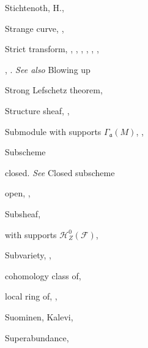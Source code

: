 {{\noindent\hspace*{0.0bp}Stichtenoth, H., \par
\noindent\hspace*{0.0bp}Strange curve, , \par
\noindent\hspace*{0.0bp}Strict transform, , , , , , ,\par
\noindent\hspace*{15.0bp}, . \emph{See also} Blowing up\par
\noindent\hspace*{0.0bp}Strong Lefschetz theorem, \par
\noindent\hspace*{0.0bp}Structure sheaf, , \par
\noindent\hspace*{0.0bp}Submodule with supports $\Gamma_{\mathfrak a}(M)$, , \par
\noindent\hspace*{0.0bp}Subscheme\par
\noindent\hspace*{7.5bp}closed. \emph{See} Closed subscheme\par
\noindent\hspace*{7.5bp}open, , \par
\noindent\hspace*{0.0bp}Subsheaf, \par
\noindent\hspace*{7.5bp}with supports $\mathcal H_Z^0(\mathcal F)$, \par
\noindent\hspace*{0.0bp}Subvariety, , \par
\noindent\hspace*{7.5bp}cohomology class of, \par
\noindent\hspace*{7.5bp}local ring of, , \par
\noindent\hspace*{0.0bp}Suominen, Kalevi, \par
\noindent\hspace*{0.0bp}Superabundance, \par
}}
